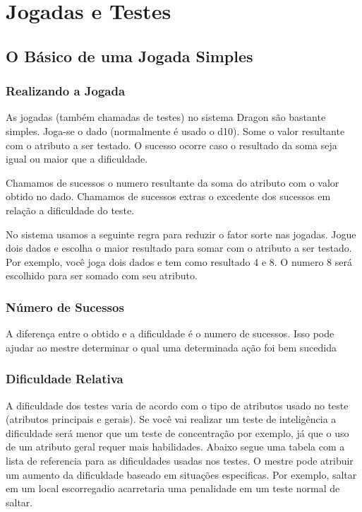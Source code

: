 
\chapter{Jogadas e Testes}
\label{Cap:testes}

\section{O Básico de uma Jogada Simples}

\subsection{Realizando a Jogada}

As jogadas (também chamadas de testes) no sistema Dragon são bastante simples. Joga-se o dado (normalmente é usado o d10). Some o valor resultante com o atributo a ser testado. O sucesso ocorre caso o resultado da soma seja igual ou maior que a dificuldade.

Chamamos de sucessos o numero resultante da soma do atributo com o valor obtido no dado. Chamamos de sucessos extras o excedente dos sucessos em relação a dificuldade do teste.   

No sistema usamos a seguinte regra para reduzir o fator sorte nas jogadas. Jogue dois dados e escolha o maior resultado para somar com o atributo a ser testado. Por exemplo, você joga dois dados e tem como resultado 4 e 8. O numero 8 será escolhido para ser somado com seu atributo. 

\subsection{Número de Sucessos}
A diferença entre o obtido e a dificuldade é o numero de sucessos. Isso pode ajudar ao mestre determinar o qual uma determinada ação foi bem sucedida

\subsection{Dificuldade Relativa}

A dificuldade dos testes varia de acordo com o tipo de atributos usado no teste (atributos principais e gerais). Se você vai realizar um teste de inteligência a dificuldade será menor que um teste de concentração por exemplo, já que o uso de um atributo geral requer mais habilidades.
Abaixo segue uma tabela com a lista de referencia para as dificuldades usadas nos testes. O mestre pode atribuir um aumento da dificuldade baseado em situações especificas. Por exemplo, saltar em um local escorregadio acarretaria uma penalidade em um teste normal de saltar.

